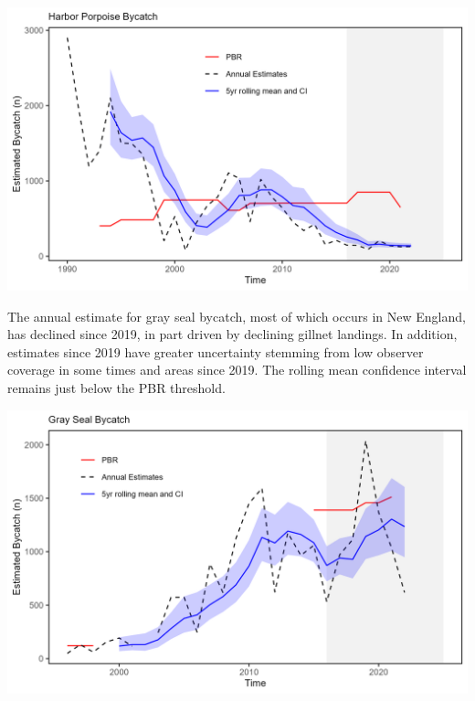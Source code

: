 \documentclass[
  10pt,
]{article}
\let\origfigure\figure
\let\endorigfigure\endfigure
\renewenvironment{figure}[1][2] {
    \expandafter\origfigure\expandafter[H]
} {
    \endorigfigure
}
\begin{document}
\begin{figure}

{\centering \includegraphics[width=6.5in]{images/BothReports/harborporpoise_BothReports_2025-09-09} 

}

\caption{Harbor porpoise average bycatch estimate for Mid-Atlantic and New England gillnet fisheries (blue) and the potential biological removal (red).}\label{fig:harborporpoise}
\end{figure}

The annual estimate for gray seal bycatch, most of which occurs in New England, has declined since 2019, in part driven by declining gillnet landings. In addition, estimates since 2019 have greater uncertainty stemming from low observer coverage in some times and areas since 2019. The rolling mean confidence interval remains just below the PBR threshold.

\begin{figure}

{\centering \includegraphics[width=6.5in]{images/BothReports/grayseal_BothReports_2025-09-09} 

}

\caption{Gray Seal average bycatch estimate for gillnet fisheries (blue) and the potential biological removal (red).}\label{fig:grayseal}
\end{figure}
\end{document}
